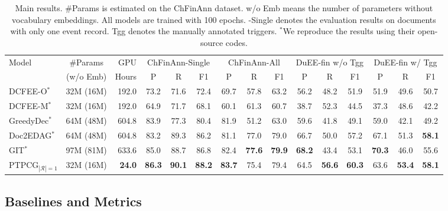 \begin{table*}[tb]
    \centering
    \small
    \begin{tabular}{lcrcccccccccccc}
        \toprule
        \multirow{2}{*}{Model} & \#Params & GPU & \multicolumn{3}{c}{ChFinAnn-Single} & \multicolumn{3}{c}{ChFinAnn-All} & \multicolumn{3}{c}{DuEE-fin w/o Tgg} & \multicolumn{3}{c}{DuEE-fin w/ Tgg}\\
        \cmidrule(lr){4-6}\cmidrule(lr){7-9}\cmidrule(lr){10-12}\cmidrule(lr){13-15}
        &(w/o Emb) & Hours & P & R & F1 & P & R & F1 & P & R & F1 & P & R & F1 \\
        \midrule
        DCFEE-O$^{*}$ & 32M (16M) & 192.0 & 73.2 & 71.6 & 72.4 & 69.7 & 57.8 & 63.2 & 56.2 & 48.2 & 51.9 & 51.9 & 49.6 & 50.7 \\
        DCFEE-M$^{*}$ & 32M (16M) & 192.0 & 64.9 & 71.7 & 68.1 & 60.1 & 61.3 & 60.7 & 38.7 & 52.3 & 44.5 & 37.3 & 48.6 & 42.2 \\
        GreedyDec$^{*}$ & 64M (48M) & 604.8 & 83.9 & 77.3 & 80.4 & 81.9 & 51.2 & 63.0 & 59.6 & 41.8 & 49.1 & 59.0 & 42.1 & 49.2 \\
        Doc2EDAG$^{*}$ & 64M (48M) & 604.8 & 83.2 & 89.3 & 86.2 & 81.1 & 77.0 & 79.0 & 66.7 & 50.0 & 57.2 & 67.1 & 51.3 & \textbf{58.1} \\
        GIT$^{*}$ & 97M (81M) & 633.6 & 85.0 & 88.7 & 86.8 & 82.4 & \textbf{77.6} & \textbf{79.9} & \textbf{68.2} & 43.4 & 53.1 & \textbf{70.3} & 46.0 & 55.6 \\
        \midrule
        PTPCG$_{|\mathcal{R}|=1}$ & 32M (16M) & \textbf{24.0} & \textbf{86.3} & \textbf{90.1} & \textbf{88.2} & \textbf{83.7} & 75.4 & 79.4 & 64.5 & \textbf{56.6} & \textbf{60.3} & 63.6 & \textbf{53.4} & \textbf{58.1} \\
        \bottomrule
    \end{tabular}
    \caption{
        Main results.
        \#Params is estimated on the ChFinAnn dataset.
        w/o Emb means the number of parameters without vocabulary embeddings.
        All models are trained with 100 epochs.
        -Single denotes the evaluation results on documents with only one event record.
        Tgg denotes the manually annotated triggers.
        $^{*}$We reproduce the results using their open-source codes.
    }
    \label{tab:exp_results_comparison}
\end{table*}

\subsection{Baselines and Metrics}

